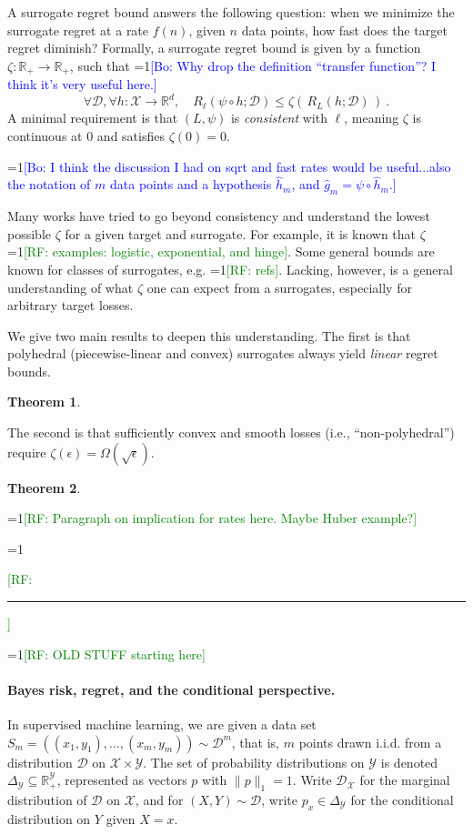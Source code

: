 \documentclass{article}
\newtheorem{theorem}{Theorem}
\newcommand{\Comments}{1}
\newcommand{\mynote}[2]{\ifnum\Comments=1\textcolor{#1}{#2}\fi}
\newcommand{\raf}[1]{\mynote{green}{[RF: #1]}}
\newcommand{\bo}[1]{\mynote{blue}{[Bo: #1]}}
\newcommand{\reals}{\mathbb{R}}
\newcommand{\simplex}{\Delta_\Y}
\newcommand{\D}{\mathcal{D}}
\newcommand{\X}{\mathcal{X}}
\newcommand{\Y}{\mathcal{Y}}
\begin{document}
A surrogate regret bound answers the following question: when we minimize the surrogate regret at a rate $f(n)$, given $n$ data points, how fast does the target regret diminish?
Formally, a surrogate regret bound is given by a function $\zeta : \reals_+ \to \reals_+$, such that
\bo{Why drop the definition ``transfer function''? I think it's very useful here.}
\begin{equation}
  \label{eq:surrogate-regret-bound}
  \forall \D, \forall h:\X\to\reals^d, \quad R_\ell(\psi\circ h;\D) \leq \zeta(\, R_L(h;\D) \,)~.
\end{equation}
A minimal requirement is that $(L,\psi)$ is \emph{consistent} with $\ell$, meaning $\zeta$ is continuous at $0$ and satisfies $\zeta(0) = 0$.

\bo{I think the discussion I had on sqrt and fast rates would be useful...also the notation of $m$ data points and a hypothesis $\hat{h}_m$, and $\hat{g}_m = \psi \circ \hat{h}_m$.}

Many works have tried to go beyond consistency and understand the lowest possible $\zeta$ for a given target and surrogate.
For example, it is known that $\zeta$ \raf{examples: logistic, exponential, and hinge}.
Some general bounds are known for classes of surrogates, e.g. \raf{refs}.
Lacking, however, is a general understanding of what $\zeta$ one can expect from a surrogates, especially for arbitrary target losses.

We give two main results to deepen this understanding.
The first is that polyhedral (piecewise-linear and convex) surrogates always yield \emph{linear} regret bounds.
\begin{theorem}
  
\end{theorem}
The second is that sufficiently convex and smooth losses (i.e., ``non-polyhedral'') require $\zeta(\epsilon) = \Omega(\sqrt{\epsilon})$.

\begin{theorem}
  
\end{theorem}

\raf{Paragraph on implication for rates here.  Maybe Huber example?}


\raf{\hrule}
\raf{OLD STUFF starting here}

\paragraph{Bayes risk, regret, and the conditional perspective.}
In supervised machine learning, we are given a data set $S_m = ((x_1,y_1), \dots, (x_m,y_m)) \sim \D^m$, that is, $m$ points drawn i.i.d. from a distribution $\D$ on $\X \times \Y$.
The set of probability distributions on $\Y$ is denoted $\simplex\subseteq\reals^{\Y}_+$, represented as vectors $p$ with $\|p\|_1 = 1$.
Write $\D_{\X}$ for the marginal distribution of $\D$ on $\X$, and for $(X,Y) \sim \D$, write $p_x \in \simplex$ for the conditional distribution on $Y$ given $X=x$.
\end{document}
